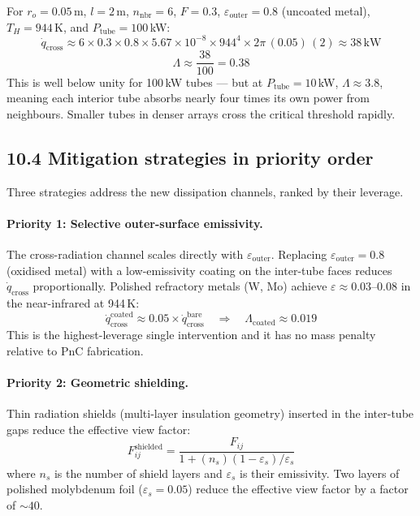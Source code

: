 \documentclass[12pt]{article}
\begin{document}
For $r_o = 0.05$\,m, $l = 2$\,m, $n_{\mathrm{nbr}} = 6$, $F = 0.3$,
$\varepsilon_{\mathrm{outer}} = 0.8$ (uncoated metal), $T_H = 944$\,K, and
$P_{\mathrm{tube}} = 100$\,kW:
\[
  \dot{q}_{\mathrm{cross}} \approx 6 \times 0.3 \times 0.8 \times
  5.67\!\times\!10^{-8} \times 944^4 \times 2\pi\,(0.05)\,(2)
  \approx 38\,\mathrm{kW}
\]
\[
  \Lambda \approx \frac{38}{100} = 0.38
\]
This is well below unity for 100\,kW tubes — but at $P_{\mathrm{tube}} =
10$\,kW, $\Lambda \approx 3.8$, meaning each interior tube absorbs nearly
four times its own power from neighbours. Smaller tubes in denser arrays
cross the critical threshold rapidly.

\subsection*{10.4 Mitigation strategies in priority order}

Three strategies address the new dissipation channels, ranked by their
leverage.

\paragraph{Priority 1: Selective outer-surface emissivity.}
The cross-radiation channel scales directly with $\varepsilon_{\mathrm{outer}}$.
Replacing $\varepsilon_{\mathrm{outer}} = 0.8$ (oxidised metal) with a
low-emissivity coating on the inter-tube faces reduces $\dot{q}_{\mathrm{cross}}$
proportionally. Polished refractory metals (W, Mo) achieve
$\varepsilon \approx 0.03$--$0.08$ in the near-infrared at 944\,K:
\[
  \dot{q}_{\mathrm{cross}}^{\mathrm{coated}} \approx 0.05 \times
  \dot{q}_{\mathrm{cross}}^{\mathrm{bare}} \quad\Rightarrow\quad
  \Lambda_{\mathrm{coated}} \approx 0.019
\]
This is the highest-leverage single intervention and it has no mass penalty
relative to PnC fabrication.

\paragraph{Priority 2: Geometric shielding.}
Thin radiation shields (multi-layer insulation geometry) inserted in the
inter-tube gaps reduce the effective view factor:
\begin{equation}
  F_{ij}^{\mathrm{shielded}} = \frac{F_{ij}}{1 + (n_s)(1-\varepsilon_s)/\varepsilon_s}
\end{equation}
where $n_s$ is the number of shield layers and $\varepsilon_s$ is their
emissivity. Two layers of polished molybdenum foil ($\varepsilon_s = 0.05$)
reduce the effective view factor by a factor of $\sim 40$.
\end{document}
